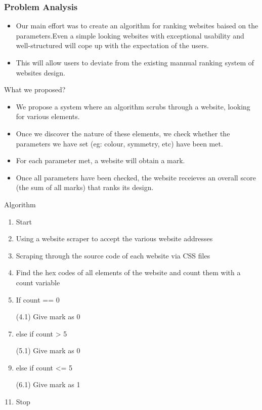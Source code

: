 \documentclass[11pt]{beamer}
\begin{document}
\begin{frame}
\frametitle{{Problem Analysis}}
\begin{itemize}
	\item Our main effort was to create an algorithm for ranking websites baised on the parameters.Even a simple looking websites with exceptional usability and well-structured will cope up with the expectation of the users.
	
	\item This will allow users to deviate from the existing mannual ranking system of websites design.
\end{itemize}
\end{frame}



		\begin{frame}{What we proposed?}
			\begin{itemize}
				\item We propose a system where an algorithm scrubs through a website, looking for various elements.
				\item Once we discover the nature of these elements, we check whether the parameters we have set (eg: colour, symmetry, etc) have been met.
				\item For each parameter met, a website will obtain a mark.
				\item Once all parameters have been checked, the website receieves an overall score (the sum of all marks) that ranks its design.
					\end{itemize}	
		\end{frame}
	\begin{frame}{Algorithm}
		\begin{enumerate}
			\item Start
			\item Using a website scraper to accept the various website addresses
			\item Scraping through the source code of each website via CSS files
			\item Find the hex codes of all elements of the website and count them with a count variable
			\item If count == 0
				\item [(4.1)] Give mark as 0
			\item else if count > 5
				\item [(5.1)] Give mark as 0
			\item else if count <= 5
				\item [(6.1)] Give mark as 1
			\item Stop
		\end{enumerate}
	\end{frame}
\end{document}
